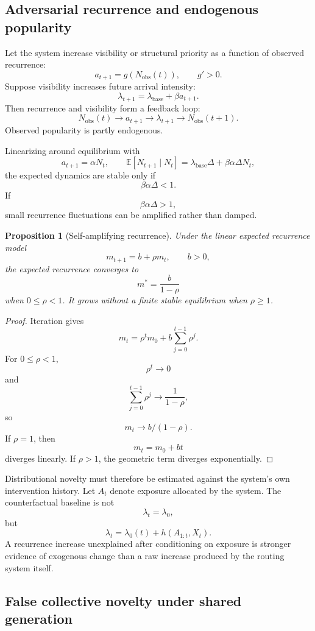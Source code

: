 \documentclass[11pt]{article}
\newtheorem{proposition}[definition]{Proposition}
\theoremstyle{definition}
\newcommand{\E}{\mathbb{E}}
\begin{document}
\subsection{Adversarial recurrence and endogenous popularity}

Let the system increase visibility or structural priority as a function of observed recurrence:
\[
a_{t+1}
=
g(N_{\mathrm{obs}}(t)),
\qquad
g'>0.
\]
Suppose visibility increases future arrival intensity:
\[
\lambda_{t+1}
=
\lambda_{\mathrm{base}}
+
\beta a_{t+1}.
\]
Then recurrence and visibility form a feedback loop:
\[
N_{\mathrm{obs}}(t)
\longrightarrow
a_{t+1}
\longrightarrow
\lambda_{t+1}
\longrightarrow
N_{\mathrm{obs}}(t+1).
\]
Observed popularity is partly endogenous.

Linearizing around equilibrium with
\[
a_{t+1}=\alpha N_t,
\qquad
\E[N_{t+1}\mid N_t]
=
\lambda_{\mathrm{base}}\Delta
+
\beta\alpha\Delta N_t,
\]
the expected dynamics are stable only if
\[
\beta\alpha\Delta<1.
\]
If
\[
\beta\alpha\Delta>1,
\]
small recurrence fluctuations can be amplified rather than damped.

\begin{proposition}[Self-amplifying recurrence]
Under the linear expected recurrence model
\[
m_{t+1}
=
b+\rho m_t,
\qquad
b>0,
\]
the expected recurrence converges to
\[
m^{*}=\frac{b}{1-\rho}
\]
when \(0\leq\rho<1\). It grows without a finite stable equilibrium when \(\rho\geq1\).
\end{proposition}

\begin{proof}
Iteration gives
\[
m_t
=
\rho^tm_0
+
b\sum_{j=0}^{t-1}\rho^j.
\]
For \(0\leq\rho<1\),
\[
\rho^t\to0
\]
and
\[
\sum_{j=0}^{t-1}\rho^j
\to
\frac{1}{1-\rho},
\]
so
\[
m_t\to b/(1-\rho).
\]
If \(\rho=1\), then
\[
m_t=m_0+bt
\]
diverges linearly. If \(\rho>1\), the geometric term diverges exponentially.
\end{proof}

Distributional novelty must therefore be estimated against the system's own intervention history. Let \(A_t\) denote exposure allocated by the system. The counterfactual baseline is not
\[
\lambda_t=\lambda_0,
\]
but
\[
\lambda_t
=
\lambda_0(t)
+
h(A_{1:t},X_t).
\]
A recurrence increase unexplained after conditioning on exposure is stronger evidence of exogenous change than a raw increase produced by the routing system itself.

\subsection{False collective novelty under shared generation}
\end{document}
